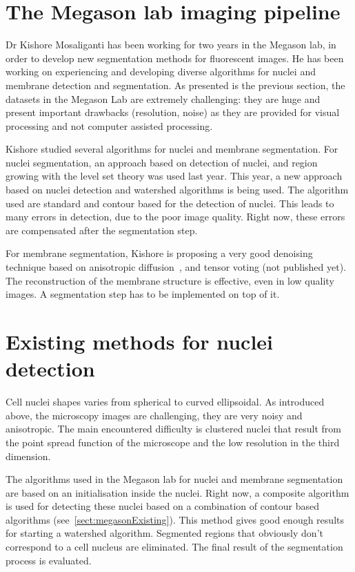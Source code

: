 \section{The Megason lab imaging pipeline}

Dr Kishore Mosaliganti has been working for two years in the Megason lab, in order to develop new segmentation methods for fluorescent images.
He has been working on experiencing and developing diverse algorithms for nuclei and membrane detection and segmentation.
As presented is the previous section, the datasets in the Megason Lab are extremely challenging:
they are huge and present important drawbacks (resolution, noise) as they are provided for visual processing and not computer assisted processing.

Kishore studied several algorithms for nuclei and membrane segmentation.
For nuclei segmentation, an approach based on detection of nuclei, and region growing with the level set theory was used last year.
This year, a new approach based on nuclei detection and watershed algorithms is being used.
The algorithm used are standard and contour based for the detection of nuclei.
This leads to many errors in detection, due to the poor image quality. Right now, these errors are compensated after the segmentation step.

For membrane segmentation, Kishore is proposing a very good denoising technique based on anisotropic diffusion~\cite{kishoreMembrane}, and tensor voting (not published yet).
The reconstruction of the membrane structure is effective, even in low quality images. A segmentation step has to be implemented on top of it.


\section{Existing methods for nuclei detection}

Cell nuclei shapes varies from spherical to curved ellipsoidal. As introduced above, the microscopy images are challenging, they are very noisy and anisotropic.
The main encountered difficulty is clustered nuclei that result from the point spread function of the microscope and the low resolution in the third dimension.

The algorithms used in the Megason lab for nuclei and membrane segmentation are based on an initialisation inside the nuclei.
Right now, a composite algorithm is used for detecting these nuclei based on a combination of contour based algorithms (see~\ref{sect:megasonExisting}).
This method gives good enough results for starting a watershed algorithm. Segmented regions that obviously don't correspond to a cell nucleus are eliminated. The final result of the segmentation process is evaluated.

